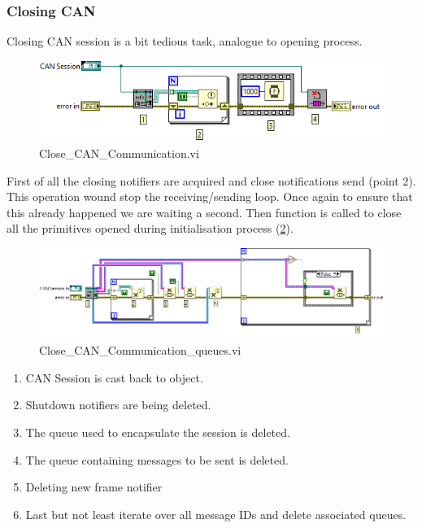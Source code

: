 \subsubsection{Closing CAN}
Closing CAN session is a bit tedious task, analogue to opening process.
\begin{figure}[h]
    \centering
    \includegraphics[scale=\visc,max width=\textwidth]{figures/Close_CAN_Communicationd}
    \caption{Close\_CAN\_Communication.vi}
    \label{vi:close_can}
\end{figure}
First of all the closing notifiers are acquired and close notifications send (point 2). This operation wound stop the receiving/sending loop. Once again to ensure that this already happened we are waiting a second. Then function is called to close all the primitives opened during initialisation process (\ref{vi:close_can_queues}).
\begin{figure}[h]
    \centering
    \includegraphics[scale=\visc,max width=\textwidth]{figures/Close_CAN_Communication_queuesd}
    \caption{Close\_CAN\_Communication\_queues.vi}
    \label{vi:close_can_queues}
\end{figure}
\begin{enumerate}
    \itemsep0.1em 
    \item CAN Session is cast back to object.
    \item Shutdown notifiers are being deleted.
    \item The queue used to encapsulate the session is deleted.
    \item The queue containing messages to be sent is deleted.
    \item Deleting new frame notifier
    \item Last but not least iterate over all message IDs and delete associated queues.
\end{enumerate}

